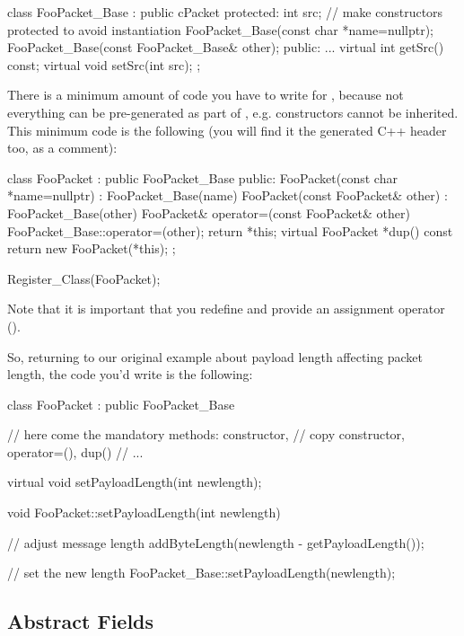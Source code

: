 \begin{cpp}
class FooPacket_Base : public cPacket
{
  protected:
    int src;
    // make constructors protected to avoid instantiation
    FooPacket_Base(const char *name=nullptr);
    FooPacket_Base(const FooPacket_Base& other);
  public:
    ...
    virtual int getSrc() const;
    virtual void setSrc(int src);
};
\end{cpp}

There is a minimum amount of code you have to write
for , because not everything can be
pre-generated as part of , e.g.
constructors cannot be inherited. This minimum
code is the following (you will find it the generated C++ header
too, as a comment):

\begin{cpp}
class FooPacket : public FooPacket_Base
{
  public:
    FooPacket(const char *name=nullptr) : FooPacket_Base(name) {}
    FooPacket(const FooPacket& other) : FooPacket_Base(other) {}
    FooPacket& operator=(const FooPacket& other)
        {FooPacket_Base::operator=(other); return *this;}
    virtual FooPacket *dup() const {return new FooPacket(*this);}
};

Register_Class(FooPacket);
\end{cpp}

Note that it is important that you redefine  and
provide an assignment operator ().

So, returning to our original example about payload length
affecting packet length, the code you'd write is the following:

\begin{cpp}
class FooPacket : public FooPacket_Base
{
    // here come the mandatory methods: constructor,
    // copy constructor, operator=(), dup()
    // ...

    virtual void setPayloadLength(int newlength);
}

void FooPacket::setPayloadLength(int newlength)
{
    // adjust message length
    addByteLength(newlength - getPayloadLength());

    // set the new length
    FooPacket_Base::setPayloadLength(newlength);
}
\end{cpp}



\subsection{Abstract Fields}
\label{sec:ch-msg-defs:abstract-fields}

